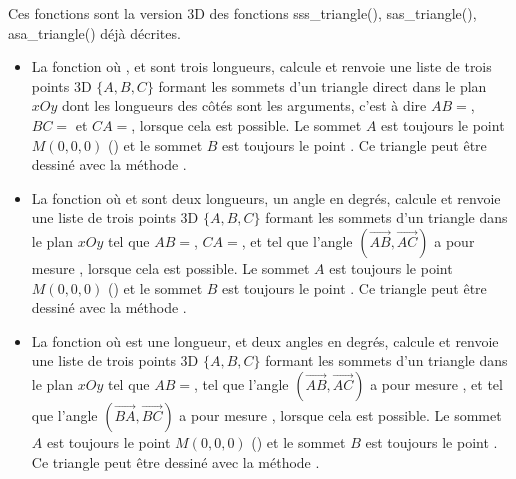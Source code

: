 Ces fonctions sont la version 3D des fonctions  sss\_triangle(), sas\_triangle(), asa\_triangle() déjà décrites.
\begin{itemize}
    \item La fonction  où ,  et  sont trois longueurs, calcule et renvoie une liste de trois points 3D $\{A,B,C\}$ formant les sommets d'un triangle direct dans le plan $xOy$ dont les longueurs des côtés sont les arguments, c'est à dire $AB=$, $BC=$ et $CA=$, lorsque cela est possible. Le sommet $A$ est toujours le point $M(0,0,0)$ () et le sommet $B$ est toujours le point . Ce triangle peut être dessiné avec la méthode .
    
    \item La fonction  où  et  sont deux longueurs,  un angle en degrés, calcule et renvoie une liste de trois points 3D $\{A,B,C\}$ formant les sommets d'un triangle dans le plan $xOy$ tel que $AB=$, $CA=$, et tel que l'angle $(\vec{AB},\vec{AC})$ a pour mesure , lorsque cela est possible. Le sommet $A$ est toujours le point $M(0,0,0)$ () et le sommet $B$ est toujours le point . Ce triangle peut être dessiné avec la méthode .
    
    \item La fonction  où  est une longueur,  et  deux angles en degrés, calcule et renvoie une liste de trois points 3D $\{A,B,C\}$ formant les sommets d'un triangle dans le plan $xOy$ tel que $AB=$, tel que l'angle $(\vec{AB},\vec{AC})$ a pour mesure , et tel que l'angle $(\vec{BA},\vec{BC})$ a pour mesure , lorsque cela est possible. Le sommet $A$ est toujours le point $M(0,0,0)$ () et le sommet $B$ est toujours le point . Ce triangle peut être dessiné avec la méthode .
\end{itemize}
